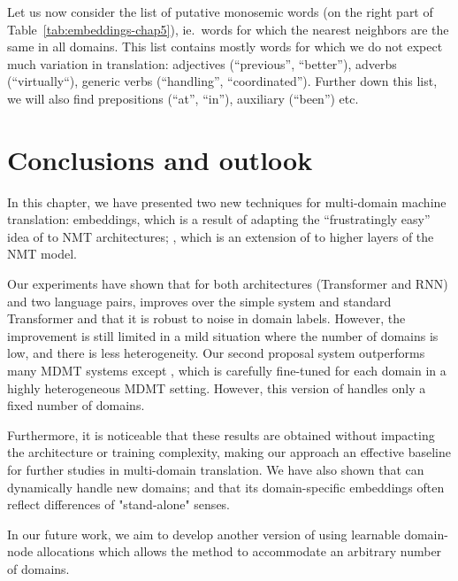 Let us now consider the list of putative monosemic words (on the right part of Table~\ref{tab:embeddings-chap5}), ie.\ words for which the nearest neighbors are the same in all domains. This list contains mostly words for which we do not expect much variation in translation: adjectives (``previous'', ``better''), adverbs (``virtually``), generic verbs (``handling'', ``coordinated''). Further down this list, we will also find prepositions (``at'', ``in''), auxiliary (``been'') etc.  

\section{Conclusions and outlook}
\label{sec:conclusion-chap5}
In this chapter, we have presented two new techniques for multi-domain machine translation:  embeddings, which is a result of adapting the ``frustratingly easy'' idea of \citet{Daume07frustratingly} to NMT architectures; , which is an extension of  to higher layers of the NMT model. 

Our experiments have shown that for both architectures (Transformer and RNN) and two language pairs,  improves over the simple  system and standard Transformer and that it is robust to noise in domain labels. However, the improvement is still limited in a mild situation where the number of domains is low, and there is less heterogeneity. Our second proposal system  outperforms many MDMT systems except , which is carefully fine-tuned for each domain in a highly heterogeneous MDMT setting. However, this version of  handles only a fixed number of domains.

Furthermore, it is noticeable that these results are obtained without impacting the architecture or training complexity, making our approach an effective baseline for further studies in multi-domain translation. We have also shown that  can dynamically handle new domains; and that its domain-specific embeddings often reflect differences of "stand-alone" senses. 

In our future work, we aim to develop another version of  using learnable domain-node allocations which allows the method to accommodate an arbitrary number of domains.

